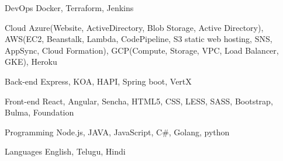 

\begin{cvskills}

  \cvskill
    {DevOps} %
    {Docker, Terraform, Jenkins} %

\cvskill
    {Cloud} %
    { Azure(Website, ActiveDirectory, Blob Storage, Active Directory), AWS(EC2, Beanstalk, Lambda, CodePipeline, S3 static web hosting, SNS, AppSync, Cloud Formation), GCP(Compute, Storage, VPC, Load Balancer, GKE), Heroku} %

  \cvskill
    {Back-end} %
    {Express, KOA, HAPI, Spring boot, VertX} %

  \cvskill
    {Front-end} %
    {React, Angular, Sencha, HTML5, CSS, LESS, SASS, Bootstrap, Bulma, Foundation} %

  \cvskill
    {Programming} %
    {Node.js, JAVA, JavaScript, C\#, Golang, python} %

  \cvskill
    {Languages} %
    {English, Telugu, Hindi} %

\end{cvskills}
